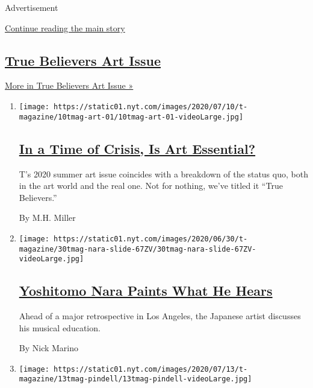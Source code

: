 Advertisement

\protect\hyperlink{after-mid1}{Continue reading the main story}

\hypertarget{true-believers-art-issue}{%
\subsection{\texorpdfstring{\href{/issue/t-magazine/2020/07/02/true-believers-art-issue}{True
Believers Art
Issue}}{True Believers Art Issue}}\label{true-believers-art-issue}}

\href{/issue/t-magazine/2020/07/02/true-believers-art-issue}{More in
True Believers Art Issue »}

\begin{enumerate}
\def\labelenumi{\arabic{enumi}.}
\item
  \texttt{[image: https://static01.nyt.com/images/2020/07/10/t-magazine/10tmag-art-01/10tmag-art-01-videoLarge.jpg]}

  \hypertarget{in-a-time-of-crisis-is-art-essential}{%
  \subsection{\texorpdfstring{\href{/2020/07/20/t-magazine/museums-galleries-open-art.html}{In
  a Time of Crisis, Is Art
  Essential?}}{In a Time of Crisis, Is Art Essential?}}\label{in-a-time-of-crisis-is-art-essential}}

  T's 2020 summer art issue coincides with a breakdown of the status
  quo, both in the art world and the real one. Not for nothing, we've
  titled it ``True Believers.''

  By M.H. Miller
\item
  \texttt{[image: https://static01.nyt.com/images/2020/06/30/t-magazine/30tmag-nara-slide-67ZV/30tmag-nara-slide-67ZV-videoLarge.jpg]}

  \hypertarget{yoshitomo-nara-paints-what-he-hears}{%
  \subsection{\texorpdfstring{\href{/2020/07/24/t-magazine/yoshitomo-nara.html}{Yoshitomo
  Nara Paints What He
  Hears}}{Yoshitomo Nara Paints What He Hears}}\label{yoshitomo-nara-paints-what-he-hears}}

  Ahead of a major retrospective in Los Angeles, the Japanese artist
  discusses his musical education.

  By Nick Marino
\item
  \texttt{[image: https://static01.nyt.com/images/2020/07/13/t-magazine/13tmag-pindell/13tmag-pindell-videoLarge.jpg]}


\end{enumerate}
